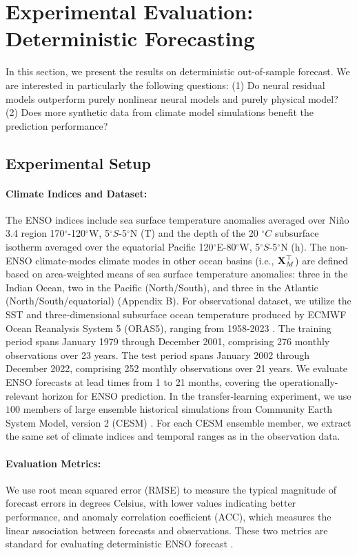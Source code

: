 \section{Experimental Evaluation: Deterministic Forecasting}
\label{sec:deterministic}

In this section, we present the results on deterministic out-of-sample forecast. We are interested in particularly the following questions:
(1) Do neural residual models outperform  purely nonlinear neural models and purely physical model? (2) Does more synthetic data from climate model simulations benefit the prediction performance?

\subsection{Experimental Setup}
\paragraph{Climate Indices and Dataset:} The ENSO indices include sea surface temperature anomalies averaged over Ni\~no 3.4 region 170$^\circ$-120$^\circ$W, 5$^\circ S$-5$^\circ$N (T) and the depth of the 20 $^\circ C$ subsurface isotherm averaged over the equatorial Pacific 120$^\circ$E-80$^\circ$W, 5$^\circ S$-5$^\circ$N (h). The non-ENSO climate-modes climate modes in other ocean basins (i.e., $\mathbf{X}_M^\top$) are defined based on area-weighted means of sea surface temperature anomalies: three in the Indian Ocean, two in the Pacific (North/South), and three in the Atlantic (North/South/equatorial) (Appendix B). For observational dataset, we utilize the SST and three-dimensional subsurface ocean temperature produced by ECMWF Ocean Reanalysis System 5 (ORAS5), ranging from 1958-2023 \cite{zuo2019oras5}. The training period spans January 1979 through December 2001, comprising 276 monthly observations over 23 years. The test period spans January 2002 through December 2022, comprising 252 monthly observations over 21 years. We evaluate ENSO forecasts at lead times from 1 to 21 months, covering the operationally-relevant horizon for ENSO prediction. In the transfer-learning experiment, we use $100$ members of large ensemble historical simulations from Community Earth System Model, version 2 (CESM) \cite{LENS}. For each CESM ensemble member, we extract the same set of climate indices and temporal ranges as in the observation data.

\paragraph{Evaluation Metrics:} We use root mean squared error (RMSE) to measure the typical magnitude of forecast errors in degrees Celsius, with lower values indicating better performance, and anomaly correlation coefficient (ACC), which measures the linear association between forecasts and observations. These two metrics are standard for evaluating deterministic ENSO forecast \cite{zhao2024xro, TangangTangMonahanHsieh1998NNEOF, KondrashovKravtsovRobertsonGhil2005EMR}. 

